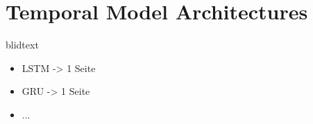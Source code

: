 \section{Temporal Model Architectures}
\label{sec:temporalModelArchitecture}

blidtext

\begin{itemize}
    \item LSTM -> 1 Seite
    \item GRU -> 1 Seite
    \item ...
\end{itemize}